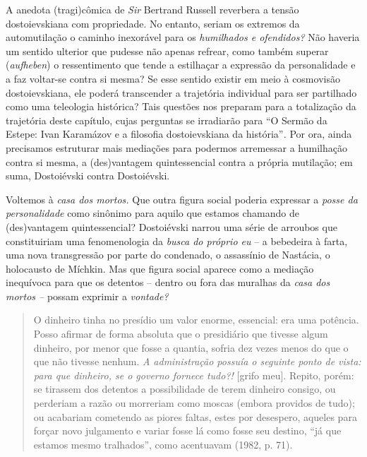 A anedota (tragi)cômica de \emph{Sir} Bertrand Russell reverbera a
tensão dostoievskiana com propriedade. No entanto, seriam os extremos da
automutilação o caminho inexorável para os \emph{humilhados e
ofendidos?} Não haveria um sentido ulterior que pudesse não apenas
refrear, como também superar (\emph{aufheben}) o ressentimento que tende
a estilhaçar a expressão da personalidade e a faz voltar-se contra si
mesma? Se esse sentido existir em meio à cosmovisão dostoievskiana, ele
poderá transcender a trajetória individual para ser partilhado como uma
teleologia histórica? Tais questões nos preparam para a totalização da
trajetória deste capítulo, cujas perguntas se irradiarão para ``O Sermão
da Estepe: Ivan Karamázov e a filosofia dostoievskiana da
história''\emph{.} Por ora, ainda precisamos estruturar mais mediações
para podermos arremessar a humilhação contra si mesma, a (des)vantagem
quintessencial contra a própria mutilação; em suma, Dostoiévski contra
Dostoiévski.

Voltemos à \emph{casa dos mortos.} Que outra figura social poderia
expressar a \emph{posse da personalidade} como sinônimo para aquilo que
estamos chamando de (des)vantagem quintessencial? Dostoiévski narrou uma
série de arroubos que constituiriam uma fenomenologia da \emph{busca do
próprio eu} -- a bebedeira à farta, uma nova transgressão por parte do
condenado, o assassínio de Nastácia, o holocausto de Míchkin. Mas que
figura social aparece como a mediação inequívoca para que os detentos --
dentro ou fora das muralhas da \emph{casa dos mortos --} possam exprimir
a \emph{vontade?}

\begin{quote}
O dinheiro tinha no presídio um valor enorme, essencial: era uma
potência. Posso afirmar de forma absoluta que o presidiário que tivesse
algum dinheiro, por menor que fosse a quantia, sofria dez vezes menos do
que o que não tivesse nenhum. \emph{A administração possuía o seguinte
ponto de vista: para que dinheiro, se o governo fornece tudo?!} {[}grifo
meu{]}. Repito, porém: se tirassem dos detentos a possibilidade de terem
dinheiro consigo, ou perderiam a razão ou morreriam como moscas (embora
providos de tudo); ou acabariam cometendo as piores faltas, estes por
desespero, aqueles para forçar novo julgamento e variar fosse lá como
fosse seu destino, ``já que estamos mesmo tralhados'', como acentuavam
(1982, p. 71).
\end{quote}

